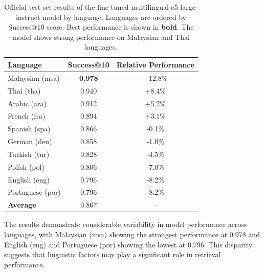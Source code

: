 \documentclass[11pt]{article}
\begin{document}
\begin{table}[t]
  \centering
  \small
  \begin{tabular}{lcc}
    \hline
    \textbf{Language} & \textbf{Success@10} & \textbf{Relative Performance} \\
    \hline
    Malaysian (msa) & \textbf{0.978} & +12.8\% \\
    Thai (tha) & 0.940 & +8.4\% \\
    Arabic (ara) & 0.912 & +5.2\% \\
    French (fra) & 0.894 & +3.1\% \\
    Spanish (spa) & 0.866 & -0.1\% \\
    German (deu) & 0.858 & -1.0\% \\
    Turkish (tur) & 0.828 & -4.5\% \\
    Polish (pol) & 0.806 & -7.0\% \\
    English (eng) & 0.796 & -8.2\% \\
    Portuguese (por) & 0.796 & -8.2\% \\
    \hline
    \textbf{Average} & 0.867 & -- \\
    \hline
  \end{tabular}
  \caption{Official test set results of the fine-tuned multilingual-e5-large-instruct model by language. Languages are ordered by Success@10 score. Best performance is shown in \textbf{bold}. The model shows strong performance on Malaysian and Thai languages.}
  \label{tab:test-results-by-language}
\end{table}



The results demonstrate considerable variability in model performance across languages, with Malaysian (msa) showing the strongest performance at 0.978 and English (eng) and Portuguese (por) showing the lowest at 0.796. This disparity suggests that linguistic factors may play a significant role in retrieval performance.
\end{document}
